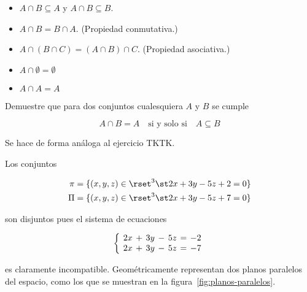\begin{itemize}
  \item $A \cap B \subseteq A$ y $A \cap B \subseteq B$.
  \item $A \cap B = B \cap A$. (Propiedad conmutativa.)
  \item $A \cap (B \cap C) = (A \cap B) \cap C$. (Propiedad asociativa.)
  \item $A \cap \emptyset = \emptyset$
  \item $A \cap A = A$
\end{itemize}

\begin{exercise}
  Demuestre que para dos conjuntos cualesquiera $A$ y $B$ se cumple

  \[ A \cap B = A \quad \text{si y solo si} \quad A \subseteq B \]

  Se hace de forma análoga al ejercicio TKTK.
\end{exercise}

\begin{exercise}
  Los conjuntos

  \begin{align*}
    \pi = \{(x, y, z) \in \rset^3 \st 2x + 3y - 5z + 2 = 0\} \\
    \Pi = \{(x, y, z) \in \rset^3 \st 2x + 3y - 5z + 7 = 0\} \\
  \end{align*}

  \noindent son disjuntos pues el sistema de ecuaciones

  \[
  \setlength\arraycolsep{4pt} %
  \left\{
    \begin{array}{
      r@{\extracolsep{\arraycolsep}}
      r@{\extracolsep{\arraycolsep}}
      r@{\extracolsep{\arraycolsep}}
      r@{\extracolsep{\arraycolsep}}
      r@{\extracolsep{\arraycolsep}}
      c@{\extracolsep{\arraycolsep}}
      l
    }
      2x &+& 3y &-& 5z &=& {-2} \\
      2x &+& 3y &-& 5z &=& {-7} \\
    \end{array}%
    \right.
  \]

  \noindent es claramente incompatible. Geométricamente representan dos
  planos paralelos del espacio, como los que se muestran en la
  figura~\ref{fig:planos-paralelos}.
\end{exercise}

